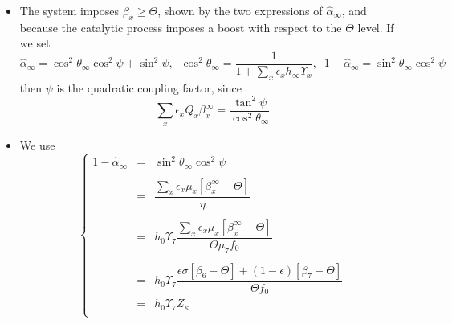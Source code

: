 \documentclass[aps,onecolumn,10pt]{revtex4}
\begin{document}
\begin{itemize}
\item The system imposes $\beta_x\geq\Theta$, shown by the two expressions of $\hat\alpha_\infty$, and because the catalytic process imposes a boost with respect to the $\Theta$ level.
If we set
\begin{equation}
	\hat\alpha_\infty = \cos^2\theta_\infty \cos^2\psi + \sin^2\psi, 
	\;\;\cos^2\theta_\infty = \dfrac{1}{1+\sum_x\epsilon_x h_\infty \Upsilon_x},\;\;1-\hat\alpha_\infty = \sin^2\theta_\infty \cos^2\psi
\end{equation}
then $\psi$ is the quadratic coupling factor, since
\begin{equation}
	\sum_x \epsilon_x Q_x \beta_x^\infty = \dfrac{\tan^2\psi}{\cos^2\theta_\infty}
\end{equation}

\item
We use
\begin{equation}
\left\lbrace
\begin{array}{rcl}
 1-\hat\alpha_\infty & = &\sin^2 \theta_\infty \cos^2 \psi\\
 \\
 & = &  \dfrac{\sum_x \epsilon_x \mu_x \left[\beta_x^\infty - \Theta\right]}{\eta} \\
 \\
 & = & h_0\Upsilon_7 \dfrac{ \sum_x \epsilon_x \mu_x \left[\beta_x^\infty - \Theta\right]}{\Theta \mu_7 f_0}\\
 \\
 & = & h_0\Upsilon_7 \dfrac{ \epsilon \sigma \left[\beta_6 - \Theta\right] + (1-\epsilon) \left[\beta_7 - \Theta\right]}
 {\Theta f_0}\\
 & = & h_0 \Upsilon_7 Z_\kappa\\
 \end{array}
 \right.
\end{equation}
\end{itemize}
\end{document}
